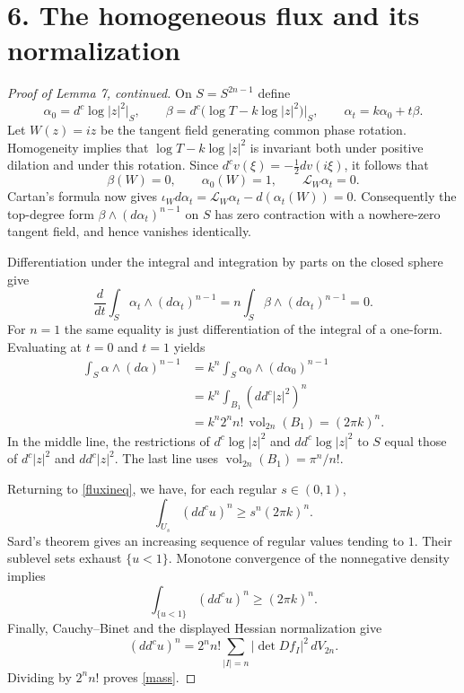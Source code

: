 \documentclass[11pt,a4paper]{article}
\newcommand{\sect}[1]{\section*{#1}}
\begin{document}
\newpage
\sect{6. The homogeneous flux and its normalization}
\begin{proof}[Proof of Lemma 7, continued]
On $S=S^{2n-1}$ define
\[
 \alpha_0=d^c\log|z|^2\big|_S,\qquad
 \beta=d^c\big(\log T-k\log|z|^2\big)\big|_S,
 \qquad\alpha_t=k\alpha_0+t\beta.
\]
Let $W(z)=iz$ be the tangent field generating common phase rotation.
Homogeneity implies that $\log T-k\log|z|^2$ is invariant both under
positive dilation and under this rotation. Since
$d^cv(\xi)=-\tfrac12dv(i\xi)$, it follows that
\[
 \beta(W)=0,\qquad\alpha_0(W)=1,\qquad
 \mathcal L_W\alpha_t=0.
\]
Cartan's formula now gives
$\iota_Wd\alpha_t=\mathcal L_W\alpha_t-d(\alpha_t(W))=0$.
Consequently the top-degree form $\beta\wedge(d\alpha_t)^{n-1}$ on
$S$ has zero contraction with a nowhere-zero tangent field, and hence
vanishes identically.

Differentiation under the integral and integration by parts on the
closed sphere give
\[
 \frac d{dt}\int_S\alpha_t\wedge(d\alpha_t)^{n-1}
 =n\int_S\beta\wedge(d\alpha_t)^{n-1}=0.
\]
For $n=1$ the same equality is just differentiation of the integral
of a one-form. Evaluating at $t=0$ and $t=1$ yields
\begin{align*}
 \int_S\alpha\wedge(d\alpha)^{n-1}
 &=k^n\int_S\alpha_0\wedge(d\alpha_0)^{n-1}\\
 &=k^n\int_{B_1}(dd^c|z|^2)^n\\
 &=k^n2^n n!\,\operatorname{vol}_{2n}(B_1)
 =(2\pi k)^n.
\end{align*}
In the middle line, the restrictions of $d^c\log|z|^2$ and
$dd^c\log|z|^2$ to $S$ equal those of $d^c|z|^2$ and $dd^c|z|^2$.
The last line uses $\operatorname{vol}_{2n}(B_1)=\pi^n/n!$.

Returning to \eqref{fluxineq}, we have, for each regular $s\in(0,1)$,
\[
 \int_{U_s}(dd^cu)^n\geq s^n(2\pi k)^n.
\]
Sard's theorem gives an increasing sequence of regular values tending
to $1$. Their sublevel sets exhaust $\{u<1\}$. Monotone convergence
of the nonnegative density implies
\[
 \int_{\{u<1\}}(dd^cu)^n\geq(2\pi k)^n.
\]
Finally, Cauchy--Binet and the displayed Hessian normalization give
\[
 (dd^cu)^n=2^n n!\sum_{|I|=n}|\det Df_I|^2\,dV_{2n}.
\]
Dividing by $2^n n!$ proves \eqref{mass}.
\end{proof}
\end{document}
